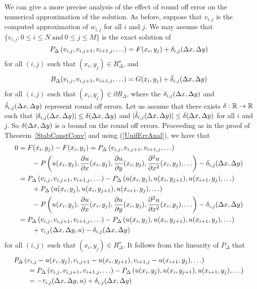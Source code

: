 We can give a more precise analysis of the effect of round off error on
the numerical approximation of the solution.  As before, suppose that
$v_{i,j}$ is the computed approximation of $w_{i,j}$ for all $i$ and
$j$.  We may assume that
$\{ v_{i,j} : 0 \leq i \leq N \ \text{and} \ 0 \leq j \leq M \}$ is
the exact solution of
\begin{equation} \label{UnifErrAnal}
P_\Delta\left(v_{i,j}, v_{i,j+1}, v_{i+1,j}, \ldots\right)
= F(x_i,y_j) + \delta_{i,j}(\Delta{x},\Delta{y})
\end{equation}
for all $(i,j)$ such that $(x_i,y_j) \in R^o_\Delta$, and
\[
B_\Delta(v_{i,j},v_{i,j+1},v_{i+1,j}, \ldots)
= G(x_i,y_j) + \tilde{\delta}_{i,j}(\Delta{x},\Delta{y})
\]
for all $(i,j)$ such that $(x_i,y_j) \in \partial R_\Delta$, where
the $\delta_{i,j}(\Delta{x},\Delta{y})$ and
$\tilde{\delta}_{i,j}(\Delta{x},\Delta{y})$ represent round off errors.
Let us assume that there exists $\delta:\mathbb{R}\to\mathbb{R}$ such that 
$|\delta_{i,j}(\Delta{x},\Delta{y})| \leq \delta(\Delta{x},\Delta{y})$
and
$|\tilde{\delta}_{i,j}(\Delta{x},\Delta{y})| \leq \delta(\Delta{x},\Delta{y})$
for all $i$ and $j$.  So $\delta(\Delta{x},\Delta{y})$ is a bound on the
round off errors.  Proceeding as in the proof of
Theorem~\ref{StabConstConv} and using (\ref{UnifErrAnal}), we have that
\begin{align*}
0 &= F(x_i,y_j) - F(x_i,y_j)
= P_\Delta\left(v_{i,j}, v_{i,j+1}, v_{i+1,j}, \ldots\right) \\
&\qquad - P\left(u(x_i,y_j), \frac{\partial{u}}{\partial{x}}(x_i,y_j), \frac{\partial{u}}{\partial{y}}(x_i,y_j),
\frac{\partial^{2}{u}}{\partial{x}^{2}}(x_i,y_j), \ldots \right) - \delta_{i,j}(\Delta{x},\Delta{y}) \\
&= P_\Delta\left(v_{i,j}, v_{i,j+1}, v_{i+1,j}, \ldots\right) - 
  P_\Delta\left(u(x_i,y_j), u(x_i,y_{j+1}), u(x_{i+1},y_j),\ldots \right) \\
&\qquad + P_\Delta\left(u(x_i,y_j), u(x_i,y_{j+1}),
  u(x_{i+1},y_j), \ldots \right) \\
&\qquad - P\left(u(x_i,y_j), \frac{\partial{u}}{\partial{x}}(x_i,y_j), \frac{\partial{u}}{\partial{y}}(x_i,y_j),
\frac{\partial^{2}{u}}{\partial{x}^{2}}(x_i,y_j), \ldots \right) - \delta_{i,j}(\Delta{x},\Delta{y}) \\
&= P_\Delta\left(v_{i,j}, v_{i,j+1}, v_{i+1,j}, \ldots\right) - 
  P_\Delta\left(u(x_i,y_j), u(x_i,y_{j+1}), u(x_{i+1},y_j),\ldots \right) \\
&\qquad + \tau_{i,j}(\Delta{x},\Delta{y},u) - \delta_{i,j}(\Delta{x},\Delta{y})
\end{align*}
for all $(i,j)$ such that $(x_i,y_j) \in R^o_\Delta$.
It follows from the linearity of $P_\Delta$ that
\begin{align*}
&P_\Delta\left(v_{i,j}-u(x_i,y_j), v_{i,j+1}-u(x_i,y_{j+1}),
v_{i+1,j}-u(x_{i+1},y_j), \ldots\right) \\
&\qquad = P_\Delta\left(v_{i,j}, v_{i,j+1}, v_{i+1,j}, \ldots\right) - 
P_\Delta\left(u(x_i,y_j), u(x_i,y_{j+1}), u(x_{i+1},y_j), \ldots \right) \\
&\qquad = -\tau_{i,j}(\Delta{x},\Delta{y},u) + \delta_{i,j}(\Delta{x},\Delta{y})
\end{align*}
